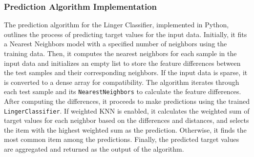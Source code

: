 \documentclass[a4paper, 12pt]{report}
\begin{document}
\subsubsection{Prediction Algorithm Implementation}
The prediction algorithm for the Linger Classifier, implemented in Python, outlines the process of predicting 
target values for the input data. Initially, it fits a Nearest Neighbors model with a specified number of 
neighbors using the training data. Then, it computes the nearest neighbors for each sample in the input 
data and initializes an empty list to store the feature differences between the test samples and their corresponding neighbors. 
If the input data is sparse, it is converted to a dense array for compatibility. 
The algorithm iterates through each test sample and its \texttt{NearestNeighbors} to calculate the feature differences. 
After computing the differences, it proceeds to make predictions using the trained \texttt{LingerClassifier}. 
If weighted KNN is enabled, it calculates the weighted sum of target values for each neighbor based on the differences 
and distances, and selects the item with the highest weighted sum as the prediction. Otherwise, 
it finds the most common item among the predictions. Finally, the predicted target values are aggregated and returned 
as the output of the algorithm.
\end{document}
